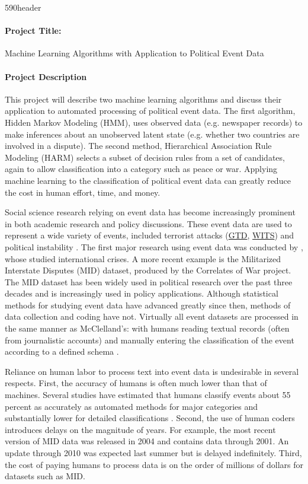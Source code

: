 \documentclass[12pt,letterpaper]{article}
\begin{document}
\cps590header

\paragraph{Project Title:} Machine Learning Algorithms with Application to Political Event Data

\paragraph{Project Description} This project will describe two machine learning algorithms and discuss their application to automated processing of political event data. The first algorithm, Hidden Markov Modeling (HMM), uses observed data (e.g. newspaper records) to make inferences about an unobserved latent state (e.g. whether two countries are involved in a dispute). The second method, Hierarchical Association Rule Modeling (HARM) selects a subset of decision rules from a set of candidates, again to allow classification into a category such as peace or war. Applying machine learning to the classification of political event data can greatly reduce the cost in human effort, time, and money. 

Social science research relying on event data has become increasingly prominent in both academic research and policy discussions. These event data are used to represent a wide variety of events, included terrorist attacks (\href{http://www.start.umd.edu/gtd/}{GTD}, \href{http://en.wikipedia.org/wiki/Worldwide_Incidents_Tracking_System}{WITS}) and political instability \citep{o2010crisis}. The first major research using event data was conducted by \citet{mcclelland1961}, whose studied international crises. A more recent example is the Militarized Interstate Disputes (MID) dataset, produced by the Correlates of War project. The MID dataset has been widely used in political research over the past three decades and is increasingly used in policy applications. Although statistical methods for studying event data have advanced greatly since then, methods of data collection and coding have not. Virtually all event datasets are processed in the same manner as McClelland's: with humans reading textual records (often from journalistic accounts) and manually entering the classification of the event according to a defined schema \citep{gerner1994, grimmer2013}. 

Reliance on human labor to process text into event data is undesirable in several respects. First, the accuracy of humans is often much lower than that of machines. Several studies have estimated that humans classify events about 55 percent as accurately as automated methods for major categories \citep{king2003automated} and substantially lower for detailed classifications \citep{mikhaylov2012coder, ruggeri2011events}. Second, the use of human coders introduces delays on the magnitude of years. For example, the most recent version of MID data was released in 2004 and contains data through 2001. An update through 2010 was expected last summer but is delayed indefinitely. Third, the cost of paying humans to process data is on the order of millions of dollars for datasets such as MID. 
\end{document}
